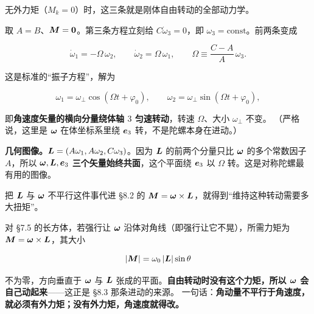 \documentclass[11pt]{ctexart}
\let\orighdr\hdr
\renewcommand{\hdr}[2]{\par\needspace{5\baselineskip}\orighdr{#1}{#2}}
\let\origsubhdr\subhdr
\renewcommand{\subhdr}[1]{\par\needspace{3\baselineskip}\origsubhdr{#1}}
\begin{document}
无外力矩（$M_k=0$）时，这三条就是刚体自由转动的全部动力学。


取 $A=B$、$\boldsymbol{M}=\boldsymbol{0}$。第三条方程立刻给 $C\dot\omega_3=0$，即 $\omega_3=\text{const}$。前两条变成

\[
\dot\omega_1=-\Omega\,\omega_2,\qquad \dot\omega_2=\Omega\,\omega_1,
\qquad
\Omega\equiv\frac{C-A}{A}\,\omega_3 .
\]

这是标准的“振子方程”，解为

\[
\omega_1=\omega_\perp\cos(\Omega t+\varphi_0),\qquad
\omega_2=\omega_\perp\sin(\Omega t+\varphi_0),
\]

即\textbf{角速度矢量的横向分量绕体轴 $3$ 匀速转动}，转速 $\Omega$、大小 $\omega_\perp$ 不变。
（严格说，这里是 $\boldsymbol{\omega}$ 在体坐标系里绕 $\boldsymbol{e}_3$ 转，不是陀螺本身在进动。）

\textbf{几何图像。}$\boldsymbol{L}=(A\omega_1,A\omega_2,C\omega_3)$。因为 $\boldsymbol{L}$ 的前两个分量只比 $\boldsymbol{\omega}$ 的多个常数因子 $A$，所以 $\boldsymbol{\omega},\boldsymbol{L},\boldsymbol{e}_3$ \textbf{三个矢量始终共面}，这个平面绕 $\boldsymbol{e}_3$ 以 $\Omega$ 转。这是对称陀螺最有用的图像。

\begin{center}
\end{center}


把 $\boldsymbol{L}$ 与 $\boldsymbol{\omega}$ 不平行这件事代进 §8.2 的 $\boldsymbol{M}=\boldsymbol{\omega}\times\boldsymbol{L}$，就得到“维持这种转动需要多大扭矩”。

对 §7.5 的长方体，若强行让 $\boldsymbol{\omega}$ 沿体对角线（即强行让它不晃），所需力矩为 $\boldsymbol{M}=\boldsymbol{\omega}\times\boldsymbol{L}$，其大小

\[
|\boldsymbol{M}|=\omega_0\,|\boldsymbol{L}|\sin\theta
\]

不为零，方向垂直于 $\boldsymbol{\omega}$ 与 $\boldsymbol{L}$ 张成的平面。\textbf{自由转动时没有这个力矩，所以 $\boldsymbol{\omega}$ 会自己动起来}——这正是 §8.3 那条进动的来源。
一句话：\textbf{角动量不平行于角速度，就必须有外力矩；没有外力矩，角速度就得改。}


\end{document}
